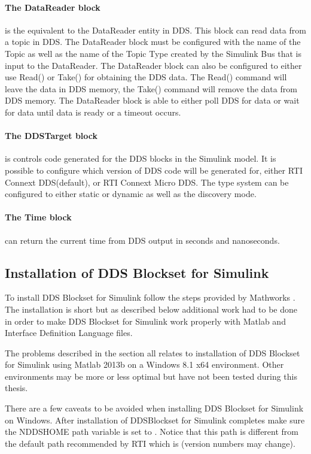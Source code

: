 \paragraph{The DataReader block} is the equivalent to the DataReader entity in DDS. This block can read data from a topic in DDS. The DataReader block must be configured with the name of the Topic as well as the name of the Topic Type created by the Simulink Bus that is input to the DataReader. The DataReader block can also be configured to either use Read() or Take() for obtaining the DDS data. The Read() command will leave the data in DDS memory, the Take() command will remove the data from DDS memory. The DataReader block is able to either poll DDS for data or wait for data until data is ready or a timeout occurs.

\paragraph{The DDSTarget block} is controls code generated for the DDS blocks in the Simulink model. It is possible to configure which version of DDS code will be generated for, either RTI Connext DDS(default), or RTI Connext Micro DDS. The type system can be configured to either static or dynamic as well as the discovery mode.

\paragraph{The Time block} can return the current time from DDS output in seconds and nanoseconds.

\subsection{Installation of DDS Blockset for Simulink}
To install DDS Blockset for Simulink follow the steps provided by Mathworks \cite{DDSBlocksetPilotSupportPackageUserGuide}. The installation is short but as described below additional work had to be done in order to make DDS Blockset for Simulink work properly with Matlab and Interface Definition Language files.

The problems described in the section all relates to installation of DDS Blockset for Simulink using Matlab 2013b on a Windows 8.1 x64 environment.
Other environments may be more or less optimal but have not been tested during this thesis.

There are a few caveats to be avoided when installing DDS Blockset for Simulink on Windows.
After installation of DDSBlockset for Simulink completes make sure the NDDSHOME path variable is set to .
Notice that this path is different from the default path recommended by RTI which is  (version numbers may change).

